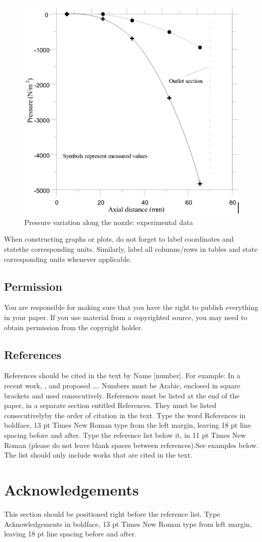\documentclass{cilamce19}
\begin{document}
\begin{figure}[H]
	\centering
	\includegraphics[scale=2]{Images/fig1.png}
	\caption{Pressure variation along the nozzle: experimental data}
	\label{fig1}
\end{figure}


When constructing graphs or plots, do not forget to label coordinates and statethe corresponding units. Similarly, label all columns/rows in tables and state corresponding units whenever applicable.

\subsection{Permission}
You are responsible for making sure that you have the right to publish everything in your paper. If you use material from a copyrighted source, you may need to obtain permission from the copyright holder.

\subsection{References}

References should be cited in the text by Name [number]. For example: In a recent work, \citet{book-example}, \citet{inbook-example} and \citet{article-example}  proposed \dots. Numbers must be Arabic, enclosed in square brackets and used consecutively. References must be listed at the end of the paper, in a separate section entitled References. They must be listed consecutivelyby the order of citation in the text. Type the word References in boldface, 13 pt Times New Roman type from the left margin, leaving 18 pt line spacing before and after. Type the reference list below it, in 11 pt Times New Roman (please do not leave blank spaces between references).See examples below. The list should only include works that are cited in the text. 

\section*{Acknowledgements}
This section should be positioned right before the reference list. Type Acknowledgements in boldface, 13 pt Times New Roman type from left margin, leaving 18 pt line spacing before and after.



  
  
\end{document}
